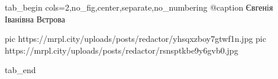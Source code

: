  
 
 
 
 

\ifcmt
  tab_begin cols=2,no_fig,center,separate,no_numbering
	   @caption Євгенія Іванівна Вєтрова

     pic https://mrpl.city/uploads/posts/redactor/yhsqxzboy7gtwf1n.jpg
		 pic https://mrpl.city/uploads/posts/redactor/rsnsptkbe9y6gvb0.jpg

  tab_end
\fi
